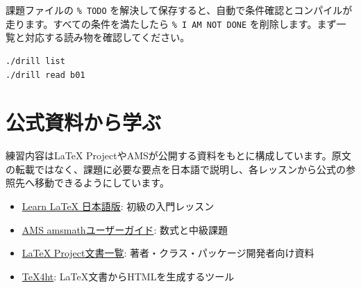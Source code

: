 \documentclass[12pt]{article}
\begin{document}
課題ファイルの \texttt{\% TODO} を解決して保存すると、自動で条件確認とコンパイルが走ります。すべての条件を満たしたら \texttt{\% I AM NOT DONE} を削除します。まず一覧と対応する読み物を確認してください。

\begin{verbatim}
./drill list
./drill read b01
\end{verbatim}

\hypertarget{sources}{}
\section*{公式資料から学ぶ}

練習内容はLaTeX ProjectやAMSが公開する資料をもとに構成しています。原文の転載ではなく、課題に必要な要点を日本語で説明し、各レッスンから公式の参照先へ移動できるようにしています。

\begin{itemize}
  \item \href{https://www.learnlatex.org/ja/}{Learn LaTeX 日本語版}: 初級の入門レッスン
  \item \href{https://www.latex-project.org/help/documentation/amsldoc_jpn.pdf}{AMS amsmathユーザーガイド}: 数式と中級課題
  \item \href{https://www.latex-project.org/help/documentation/}{LaTeX Project文書一覧}: 著者・クラス・パッケージ開発者向け資料
  \item \href{https://tug.org/tex4ht/}{TeX4ht}: LaTeX文書からHTMLを生成するツール
\end{itemize}

\end{document}
